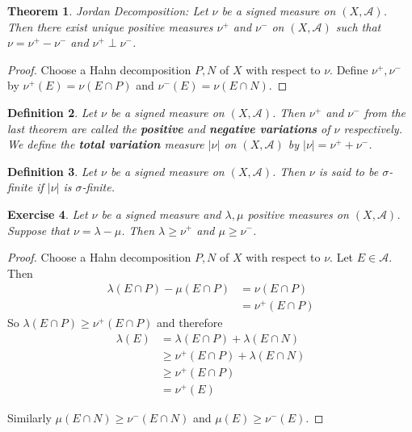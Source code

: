 \documentclass[12pt]{amsart}
\newtheorem{thm}{Theorem}[subsection]
\newtheorem{defn}[thm]{Definition}
\newtheorem{ex}[thm]{Exercise}
\newcommand{\lam}{\lambda}
\newcommand{\sig}{\sigma}
\newcommand{\MA}{\mathcal{A}}
\begin{document}
\begin{thm}{Jordan Decomposition:}
	Let $\nu$ be a signed measure on $(X, \MA)$. Then there exist unique positive measures $\nu^+$ and $\nu^-$ on $(X, \MA)$ such that $\nu = \nu^+ - \nu^-$ and $\nu^+ \perp \nu^-$. 
\end{thm}

\begin{proof}
	Choose a Hahn decomposition $P,N$ of $X$ with respect to $\nu$. Define $\nu^+, \nu^-$ by $\nu^+(E)= \nu(E \cap P)$ and $\nu^-(E) = \nu(E \cap N)$.
\end{proof}

\begin{defn}
	Let $\nu$ be a signed measure on $(X, \MA)$. Then $\nu^+$ and $\nu^-$ from the last theorem are called the \textbf{positive} and \textbf{negative variations} of $\nu$ respectively. We define the \textbf{total variation} measure $|\nu|$ on $(X, \MA)$ by $|\nu| = \nu^+ + \nu^-$. 
\end{defn}

\begin{defn}
	Let $\nu$ be a signed measure on $(X,\MA)$. Then $\nu$ is said to be $\sig$-finite if $|\nu|$ is $\sig$-finite.
\end{defn}

\begin{ex}
	Let $\nu$ be a signed measure and $\lam, \mu$ positive measures on $(X,\MA)$. Suppose that $\nu = \lam - \mu$. Then $\lam \geq \nu^+$ and $\mu \geq \nu^-$.
\end{ex}

\begin{proof}
	Choose a Hahn decomposition $P,N$ of $X$ with respect to $\nu$. Let $E \in \MA$. Then 
	\begin{align*}
		\lam(E \cap P) - \mu(E \cap P) 
		&= \nu(E \cap P)\\
		&= \nu^+(E \cap P)
	\end{align*}
	So $\lam(E \cap P) \geq  \nu^+(E \cap P) $ and therefore 
	\begin{align*}
		\lam(E) 
		&= \lam(E \cap P) + \lam(E \cap N)\\
		& \geq \nu^+(E \cap P) + \lam (E \cap N)\\
		& \geq \nu^+(E \cap P)\\
		& = \nu^+(E)
	\end{align*} 
	
	Similarly $\mu(E \cap N) \geq \nu^-(E \cap N)$ and $\mu(E) \geq \nu^-(E)$.
\end{proof}
\end{document}
